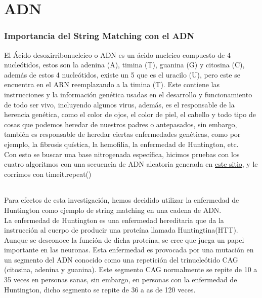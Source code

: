 \part*{ADN}%

\section*{Importancia del String Matching con el ADN}

\quad El Ácido desoxirribonucleico o ADN es un ácido nucleico compuesto de 4 nucleótidos, estos son la adenina (A), timina (T), guanina (G) y citosina (C), además de estos 4 nucleótidos, existe un 5 que es el uracilo (U), pero este se encuentra en el ARN reemplazando a la timina (T). Este contiene las instrucciones y la información genética usadas en el desarrollo y funcionamiento de todo ser vivo, incluyendo algunos virus, además, es el responsable de la herencia genética, como el color de ojos, el color de piel, el cabello y todo tipo de cosas que podemos heredar de nuestros padres o antepasados, sin embargo, también es responsable de heredar ciertas enfermedades genéticas, como por ejemplo, la fibrosis quística, la hemofilia, la enfermedad de Huntington, etc. \\

\quad Con esto se buscar una base nitrogenada específica, hicimos pruebas con los cuatro algoritmos con una secuencia de ADN aleatoria generada en \href{http://www.faculty.ucr.edu/~mmaduro/random.htm}{este sitio}, y le corrimos con timeit.repeat() 
\begin{tabular}{|c|c|c|c|}

\end{tabular}

\quad Para efectos de esta investigación, hemos decidido utilizar la enfermedad de Huntington como ejemplo de string matching en una cadena de ADN. \\

\quad La enfermedad de Huntington es una enfermedad hereditaria que da la instrucción al cuerpo de producir una proteína llamada Huntingtina(HTT). Aunque se desconoce la función de dicha proteína, se cree que juega un papel importante en las neuronas. Esta enfermedad es provocada por una mutación en un segmento del ADN conocido como una repetición del trinucleótido CAG (citosina, adenina y guanina). Este segmento CAG normalmente se repite de 10 a 35 veces en personas sanas, sin embargo, en personas con la enfermedad de Huntington, dicho segmento se repite de 36 a as de 120 veces. \\


